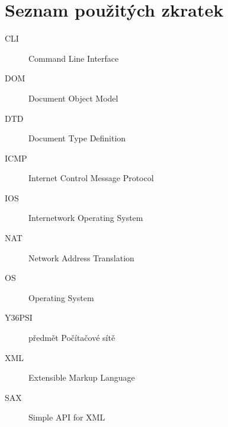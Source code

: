 \documentclass[11pt,twoside,a4paper]{book}
\begin{document}
% 


\chapter{Seznam použitých zkratek}

\begin{description}
\item[CLI] Command Line Interface
\item[DOM] Document Object Model
\item[DTD] Document Type Definition
\item[ICMP] Internet Control Message Protocol
\item[IOS] Internetwork Operating System
\item[NAT] Network Address Translation
\item[OS] Operating System
\item[Y36PSI] předmět Počítačové sítě
\item[XML] Extensible Markup Language
\item [SAX] Simple API for XML
\end{description}
\end{document}
